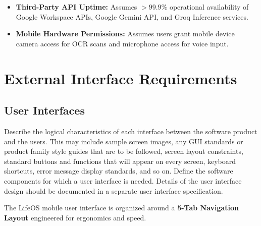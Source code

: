 \documentclass[11pt,a4paper]{article}
\begin{document}
\begin{itemize}
    \item \textbf{Third-Party API Uptime:} Assumes $>99.9\%$ operational availability of Google Workspace APIs, Google Gemini API, and Groq Inference services.
    \item \textbf{Mobile Hardware Permissions:} Assumes users grant mobile device camera access for OCR scans and microphone access for voice input.
\end{itemize}

\newpage
\section{External Interface Requirements}

\subsection{User Interfaces}
Describe the logical characteristics of each interface between the software product and the users. This may include sample screen images, any GUI standards or product family style guides that are to be followed, screen layout constraints, standard buttons and functions that will appear on every screen, keyboard shortcuts, error message display standards, and so on. Define the software components for which a user interface is needed. Details of the user interface design should be documented in a separate user interface specification.

The LifeOS mobile user interface is organized around a \textbf{5-Tab Navigation Layout} engineered for ergonomics and speed.
\end{document}
